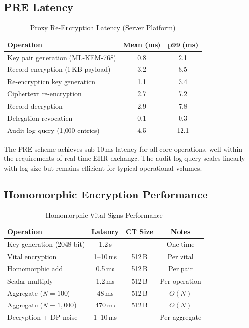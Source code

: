 \documentclass[conference,10pt]{IEEEtran}
\newcommand{\mlkem}{\textsf{ML-KEM}}
\begin{document}
\subsection{PRE Latency}

\begin{table}[htbp]
\centering
\caption{Proxy Re-Encryption Latency (Server Platform)}
\label{tab:pre_perf}
\begin{tabular}{@{}lcc@{}}
\toprule
\textbf{Operation} & \textbf{Mean (ms)} & \textbf{p99 (ms)} \\
\midrule
Key pair generation (\mlkem{}-768) & 0.8 & 2.1 \\
Record encryption (1\,KB payload) & 3.2 & 8.5 \\
Re-encryption key generation & 1.1 & 3.4 \\
Ciphertext re-encryption & 2.7 & 7.2 \\
Record decryption & 2.9 & 7.8 \\
Delegation revocation & 0.1 & 0.3 \\
Audit log query (1{,}000 entries) & 4.5 & 12.1 \\
\bottomrule
\end{tabular}
\end{table}

The PRE scheme achieves sub-10\,ms latency for all core operations, well within the requirements of real-time EHR exchange. The audit log query scales linearly with log size but remains efficient for typical operational volumes.

\subsection{Homomorphic Encryption Performance}

\begin{table}[htbp]
\centering
\caption{Homomorphic Vital Signs Performance}
\label{tab:he_perf}
\begin{tabular}{@{}lccc@{}}
\toprule
\textbf{Operation} & \textbf{Latency} & \textbf{CT Size} & \textbf{Notes} \\
\midrule
Key generation (2048-bit) & 1.2\,s & --- & One-time \\
Vital encryption & 1--10\,ms & 512\,B & Per vital \\
Homomorphic add & 0.5\,ms & 512\,B & Per pair \\
Scalar multiply & 1.2\,ms & 512\,B & Per operation \\
Aggregate ($N=100$) & 48\,ms & 512\,B & $O(N)$ \\
Aggregate ($N=1{,}000$) & 470\,ms & 512\,B & $O(N)$ \\
Decryption + DP noise & 1--10\,ms & --- & Per aggregate \\
\bottomrule
\end{tabular}
\end{table}
\end{document}
